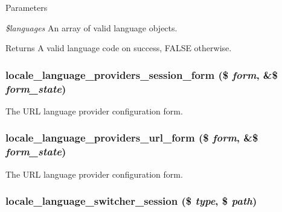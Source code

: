 \begin{DoxyParams}{Parameters}
\item[{\em \$languages}]An array of valid language objects.\end{DoxyParams}
\begin{DoxyReturn}{Returns}
A valid language code on success, FALSE otherwise. 
\end{DoxyReturn}
\hypertarget{group__locale_ga16437fdd6666d431070599a6243cfb11}{
\subsubsection[{locale\_\-language\_\-providers\_\-session\_\-form}]{\setlength{\rightskip}{0pt plus 5cm}locale\_\-language\_\-providers\_\-session\_\-form (\$ {\em form}, \/  \&\$ {\em form\_\-state})}}
\label{group__locale_ga16437fdd6666d431070599a6243cfb11}
The URL language provider configuration form. \hypertarget{group__locale_ga8317379be8d1288234df3c3ffb7d39ee}{
\subsubsection[{locale\_\-language\_\-providers\_\-url\_\-form}]{\setlength{\rightskip}{0pt plus 5cm}locale\_\-language\_\-providers\_\-url\_\-form (\$ {\em form}, \/  \&\$ {\em form\_\-state})}}
\label{group__locale_ga8317379be8d1288234df3c3ffb7d39ee}
The URL language provider configuration form. \hypertarget{group__locale_ga62ade6d961ed1194a462bc27873fee64}{
\subsubsection[{locale\_\-language\_\-switcher\_\-session}]{\setlength{\rightskip}{0pt plus 5cm}locale\_\-language\_\-switcher\_\-session (\$ {\em type}, \/  \$ {\em path})}}
\label{group__locale_ga62ade6d961ed1194a462bc27873fee64}

